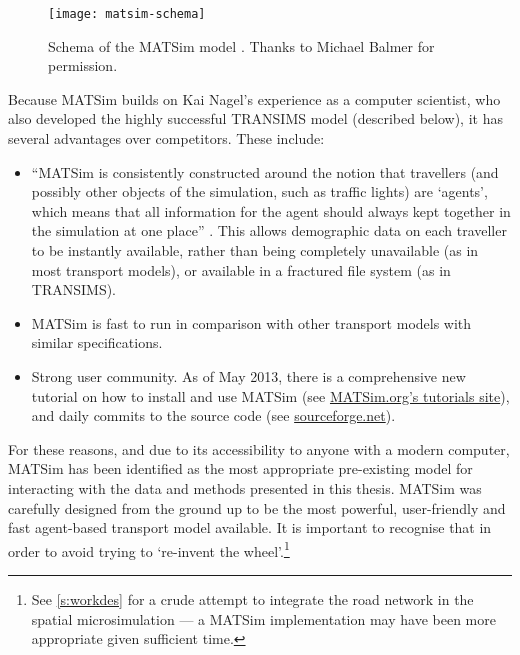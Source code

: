 \begin{figure}[hb] \centerline{
\texttt{[image: matsim-schema]}}
\caption[MATSim schema (permission: Michael Balmer)]{Schema of the MATSim
model \citep{Balmer2009}. Thanks to Michael Balmer for permission.}
\label{fmatsim-schema}
\end{figure}

Because MATSim builds on Kai Nagel's experience as a computer scientist, who
also developed the highly successful TRANSIMS model (described below),
it has several advantages over competitors. These include:
\begin{itemize}
 \item ``MATSim is consistently constructed around the notion that travellers
 (and possibly other objects of the simulation, such as traffic lights) are `agents',
 which means that all information for the agent should always kept together in
 the simulation at one place'' \citep[p.~9]{Balmer2009}. This allows demographic
 data on each traveller to be instantly available, rather than being completely
 unavailable (as in most transport models),
 or available in a fractured file system (as in TRANSIMS).
 \item MATSim is fast to run in comparison with other transport
 models with similar specifications.
 \item Strong user community. As of May 2013, there is a comprehensive
 new tutorial on how to install and use MATSim (see
 \href{http://www.matsim.org/docs/tutorials/}{MATSim.org's tutorials site}),
 and daily commits to the source
 code (see \href{http://sourceforge.net/apps/trac/matsim/timeline}{sourceforge.net}).
\end{itemize}
For these reasons, and due to its accessibility to anyone with a modern computer,
MATSim has been identified as the most appropriate pre-existing model for
interacting with the data and methods presented in this thesis. MATSim
was carefully designed from the ground up to be the most powerful, user-friendly
and fast agent-based transport model available. It is important to recognise
that in order to avoid trying to `re-invent the
wheel'.\footnote{See \cref{s:workdes}
for a crude attempt to integrate the road network in the spatial microsimulation
--- a MATSim implementation may have been more appropriate given sufficient
time.
}

